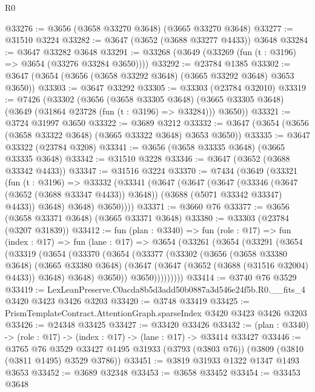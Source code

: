 \begin{lexlean}{R0}
\begin{coremodule}
@33276 := @3656 (@3658 @33270 @3648) (@3665 @33270 @3648)
@33277 := @31510 @3224
@33282 := @3647 (@3652 (@3688 @33277 @4433)) @3648
@33284 := @3647 @33282 @3648
@33291 := @33268 (@3649 (@33269 (fun (t : @3196) => @3654 (@33276 @33284 @3650))))
@33292 := @23784 @1385
@33302 := @3647 (@3654 (@3656 (@3658 @33292 @3648) (@3665 @33292 @3648) @3653 @3650))
@33303 := @3647 @33292
@33305 := @33303 (@23784 @32010)
@33319 := @7426
    (@33302
      (@3656
        (@3658 @33305 @3648)
        (@3665 @33305 @3648)
        (@3649 (@31864 @23728 (fun (t : @3196) => @33284)))
        @3650))
@33321 := @3724 @31997 @3650
@33322 := @3689 @3212
@33332 := @3647 (@3654 (@3656 (@3658 @33322 @3648) (@3665 @33322 @3648) @3653 @3650))
@33335 := @3647 @33322 (@23784 @3208)
@33341 := @3656 (@3658 @33335 @3648) (@3665 @33335 @3648)
@33342 := @31510 @3228
@33346 := @3647 (@3652 (@3688 @33342 @4433))
@33347 := @31516 @3224
@33370 := @7434
    (@3649
      (@33321
        (fun (t : @3196) =>
        @33332
          (@33341
            (@3647
              (@3647
                (@3647
                  (@33346 (@3647 (@3652 (@3688 @33347 @4433)) @3648))
                  (@3688 (@5071 @33342 @33347) @4433))
                @3648)
              @3648)
            @3650))))
@33371 := @3660 @76
@33377 := @3656 (@3658 @33371 @3648) (@3665 @33371 @3648)
@33380 := @33303 (@23784 (@3207 @31839))
@33412 := fun (plan : @3340) =>
  fun (role : @17) =>
  fun (index : @17) =>
  fun (lane : @17) =>
  @3654
    (@33261
      (@3654
        (@33291
          (@3654
            (@33319
              (@3654
                (@33370
                  (@3654
                    (@33377
                      (@33302
                        (@3656
                          (@3658 @33380 @3648)
                          (@3665 @33380 @3648)
                          (@3647 (@3647 (@3652 (@3688 (@31516 @32004) @4433)) @3648) @3648)
                          @3650))
                      @3650)))))))))
@33414 := @3740 @76 @3529
@33419 := LexLeanPreserve.C0acda8b5d3add50b0887a3d546e24f5b.R0.__fits_4 @3420 @3423 @3426 @3203
@33420 := @3748 @33419
@33425 := PrismTemplateContract.AttentionGraph.sparseIndex @3420 @3423 @3426 @3203
@33426 := @24348 @33425
@33427 := @33420 @33426
@33432 := (plan : @3340) -> (role : @17) -> (index : @17) -> (lane : @17) -> @33414 @33427
@33446 := @3765
    @76
    @3529
    @33427
    @1495
    @31933
    (@3793 (@3803 @76))
    (@3809 (@3810 (@3811 @1495) @3529 @3786))
@33451 := @3819 @31933 @1322 @1347 @1493 @3653
@33452 := @3689 @32348
@33453 := @3658 @33452
@33454 := @33453 @3648

\end{coremodule}
\end{lexlean}
